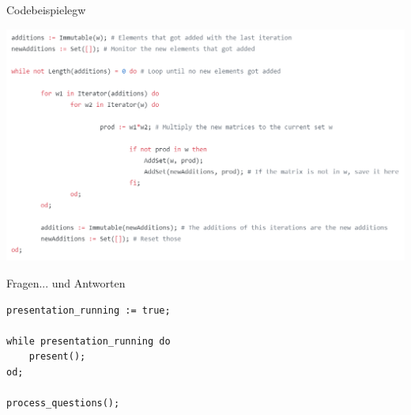 \documentclass[9pt]{beamer}
\begin{document}
\begin{frame}{Codebeispiele}{gw}
\begin{center}
\includegraphics[scale=0.6]{assets/gw_code.png}
\end{center}
\end{frame}
\begin{frame}[fragile]{Fragen}{... und Antworten}
\begin{verbatim}
presentation_running := true;

while presentation_running do
	present();
od;

process_questions();
\end{verbatim}
\end{frame}
\end{document}

